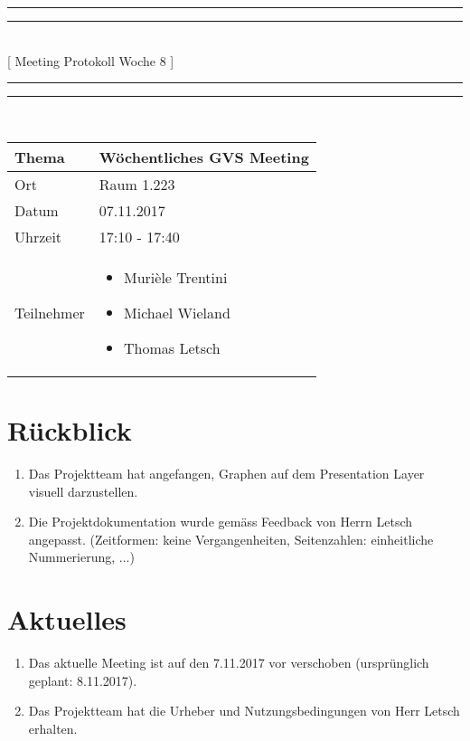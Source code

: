 \documentclass[11pt, a4paper,oneside]{scrartcl}
\begin{document}
\centering
\rule{\textwidth}{1.6pt}\vspace*{-\baselineskip}\vspace*{2pt} %
\rule{\textwidth}{0.4pt}\\[\baselineskip] %
{\LARGE [ Meeting Protokoll Woche 8 ]}\\[0.2\baselineskip] %
\rule{\textwidth}{0.4pt}\vspace*{-\baselineskip}\vspace{3.2pt} %
\rule{\textwidth}{1.6pt}\\[2\baselineskip] %

\begin{tabu} to \linewidth {l X }
	\toprule
	\textbf{Thema} & \textbf{Wöchentliches GVS Meeting} \\
	\midrule
	Ort & Raum 1.223 \\
	Datum & 07.11.2017  \\
	Uhrzeit &  17:10 - 17:40  \\
	Teilnehmer & 
	\begin{minipage}[t]{\textwidth}
	  	\begin{itemize}
			\item Murièle Trentini
			\item Michael Wieland
			\item Thomas Letsch
	  	\end{itemize}
	\end{minipage}
	\\
	\bottomrule
\end{tabu}


\section{Rückblick}
\begin{enumerate}
	\item Das Projektteam hat angefangen, Graphen auf dem Presentation Layer visuell darzustellen. 
	\item Die Projektdokumentation wurde gemäss Feedback von Herrn Letsch angepasst. (Zeitformen: keine Vergangenheiten, Seitenzahlen: einheitliche Nummerierung, ...)
\end{enumerate}

\section{Aktuelles}
\begin{enumerate}
	\item Das aktuelle Meeting ist auf den 7.11.2017 vor verschoben (ursprünglich geplant: 8.11.2017).
	\item Das Projektteam hat die Urheber und Nutzungsbedingungen von Herr Letsch erhalten.
\end{enumerate}
\end{document}
